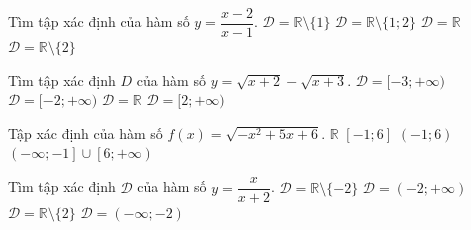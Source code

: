 

\begin{ex}%
	Tìm tập xác định  của hàm số $y=\dfrac{x-2}{x-1}$.
	 \choice
		 {\True $\mathscr{D}=\mathbb{R} \setminus \{1\}$}
		 {$\mathscr{D}=\mathbb{R} \setminus \{1;2\}$}
		 {$\mathscr{D}=\mathbb{R}$}
		{$\mathscr{D}=\mathbb{R} \setminus  \{2\}$}
\end{ex}

\begin{ex}%
	Tìm tập xác định  $D$ của hàm số $y=\sqrt{x+2}-\sqrt{x+3}$.
	 \choice
		{$\mathscr{D}=[-3;+\infty)$} 
		 {\True $\mathscr{D}=[-2;+\infty)$}
		 {$\mathscr{D}=\mathbb{R}$}
		 {$\mathscr{D}=[2;+\infty)$}
	 \loigiai{
		Hàm số xác định khi và  chỉ khi $\heva{&x+2\ge 0\\&x+3\ge 0} \Leftrightarrow x\ge-2.$\\
	 Vậy $\mathscr{D}=[-2;+\infty)$.}
\end{ex}

\begin{ex}%
	Tập  xác định của hàm số $f(x)=\sqrt{-x^{2}+5x+6}$.
	\choice 
		 {$\mathbb{R}$}
		 {\True $\left[-1;6\right]$}
		 {$\left(-1;6\right)$}
		{$\left(-\infty;-1\right]\cup\left[6;+\infty\right)$} 
\end{ex}

\begin{ex}%
	Tìm tập  xác định $\mathscr{D}$ của hàm số $y=\dfrac{x}{x+2}$.
	 \choice
		{\True $\mathscr{D}=\mathbb{R} \setminus \{-2\}$} 
		{$\mathscr{D}=(-2;+\infty)$} 
		{$\mathscr{D}=\mathbb{R}  \setminus \{2\}$}
		{$\mathscr{D}=(-\infty;-2)$} 
\end{ex}

